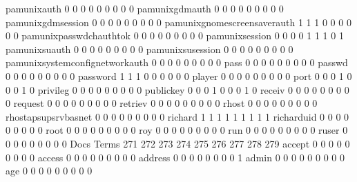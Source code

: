 \documentclass[compress,8pt]{beamer}
\begin{document}
\begin{frame}
\begin{Schunk}
  pamunixauth                                0   0   0   0   0   0   0   0   0
  pamunixgdmauth                             0   0   0   0   0   0   0   0   0
  pamunixgdmsession                          0   0   0   0   0   0   0   0   0
  pamunixgnomescreensaverauth                1   1   1   0   0   0   0   0   0
  pamunixpasswdchauthtok                     0   0   0   0   0   0   0   0   0
  pamunixsession                             0   0   0   0   1   1   1   0   1
  pamunixsuauth                              0   0   0   0   0   0   0   0   0
  pamunixsusession                           0   0   0   0   0   0   0   0   0
  pamunixsystemconfignetworkauth             0   0   0   0   0   0   0   0   0
  pass                                       0   0   0   0   0   0   0   0   0
  passwd                                     0   0   0   0   0   0   0   0   0
  password                                   1   1   1   0   0   0   0   0   0
  player                                     0   0   0   0   0   0   0   0   0
  port                                       0   0   0   1   0   0   0   1   0
  privileg                                   0   0   0   0   0   0   0   0   0
  publickey                                  0   0   0   1   0   0   0   1   0
  receiv                                     0   0   0   0   0   0   0   0   0
  request                                    0   0   0   0   0   0   0   0   0
  retriev                                    0   0   0   0   0   0   0   0   0
  rhost                                      0   0   0   0   0   0   0   0   0
  rhostapsupsrvbasnet                        0   0   0   0   0   0   0   0   0
  richard                                    1   1   1   1   1   1   1   1   1
  richarduid                                 0   0   0   0   0   0   0   0   0
  root                                       0   0   0   0   0   0   0   0   0
  roy                                        0   0   0   0   0   0   0   0   0
  run                                        0   0   0   0   0   0   0   0   0
  ruser                                      0   0   0   0   0   0   0   0   0
                                          Docs
Terms                                      271 272 273 274 275 276 277 278 279
  accept                                     0   0   0   0   0   0   0   0   0
  access                                     0   0   0   0   0   0   0   0   0
  address                                    0   0   0   0   0   0   0   0   1
  admin                                      0   0   0   0   0   0   0   0   0
  age                                        0   0   0   0   0   0   0   0   0

\end{Schunk}
\end{frame}
\end{document}
